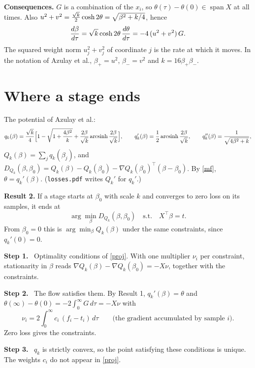 \documentclass[10pt]{article}
\newcommand{\step}[1]{\par\smallskip\textbf{Step #1.}\ }
\begin{document}
\textbf{Consequences.} $G$ is a combination of the $x_i$, so $\theta(\tau)-\theta(0)\in\operatorname{span}X$ at all times. Also $u^2+v^2=\frac{\sqrt k}2\cosh2\theta=\sqrt{\beta^2+k/4}$, hence
\begin{equation}\label{metric}
\frac{d\beta}{d\tau}=\sqrt k\cosh2\theta\,\frac{d\theta}{d\tau}=-4\,(u^2+v^2)\,G .
\end{equation}
The squared weight norm $u_j^2+v_j^2$ of coordinate $j$ is the rate at which it moves. In the notation of Azulay et al., $\beta_+=u^2$, $\beta_-=v^2$ and $k=16\beta_+\beta_-$.

\section{Where a stage ends}
The potential of Azulay et al.:
\[
q_k(\beta)=\frac{\sqrt k}4\Big[1-\sqrt{1+\frac{4\beta^2}k}+\frac{2\beta}{\sqrt k}\operatorname{arcsinh}\frac{2\beta}{\sqrt k}\Big],\qquad q_k'(\beta)=\frac12\operatorname{arcsinh}\frac{2\beta}{\sqrt k},\qquad q_k''(\beta)=\frac1{\sqrt{4\beta^2+k}} ,
\]
$Q_k(\beta)=\sum_jq_k(\beta_j)$, and $D_{Q_k}(\beta,\beta_0)=Q_k(\beta)-Q_k(\beta_0)-\nabla Q_k(\beta_0)^\top(\beta-\beta_0)$. By \eqref{mf}, $\theta=q_k'(\beta)$. (\texttt{losses.pdf} writes $Q_k'$ for $q_k'$.)

\textbf{Result 2.} If a stage starts at $\beta_0$ with scale $k$ and converges to zero loss on its samples, it ends at
\begin{equation}\label{proj}
\arg\min_\beta D_{Q_k}(\beta,\beta_0)\quad\text{s.t.}\quad X^\top\beta=t .
\end{equation}
From $\beta_0=0$ this is $\arg\min_\beta Q_k(\beta)$ under the same constraints, since $q_k'(0)=0$.
\step1 Optimality conditions of \eqref{proj}. With one multiplier $\nu_i$ per constraint, stationarity in $\beta$ reads $\nabla Q_k(\beta)-\nabla Q_k(\beta_0)=-X\nu$, together with the constraints.
\step2 The flow satisfies them. By Result 1, $q_k'(\beta)=\theta$ and $\theta(\infty)-\theta(0)=-2\int_0^\infty G\,d\tau=-X\nu$ with
\[
\nu_i=2\int_0^\infty c_i\,(f_i-t_i)\,d\tau\qquad\text{(the gradient accumulated by sample $i$).}
\]
Zero loss gives the constraints.
\step3 $q_k$ is strictly convex, so the point satisfying these conditions is unique. The weights $c_i$ do not appear in \eqref{proj}.
\end{document}
